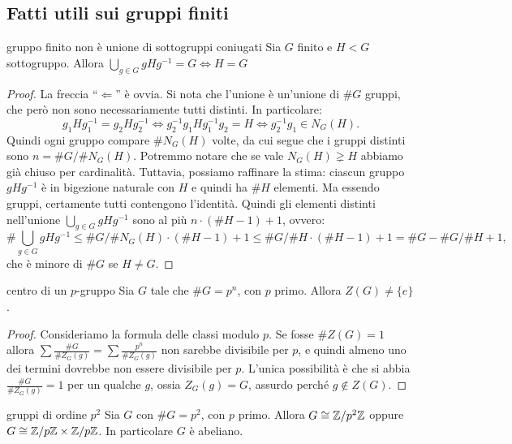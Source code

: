 \hypertarget{gruppi finiti}{
\subsection{Fatti utili sui gruppi finiti}
}
\hypertarget{es1}{
\begin{proposition}{gruppo finito non è unione di sottogruppi coniugati}
    Sia $G$ finito e $H <G$ sottogruppo. Allora $\bigcup_{g \in G} gHg^{-1} = G \iff H = G$
\end{proposition}
}
\begin{proof}
    La freccia ``$\Leftarrow$'' è ovvia. Si nota che l'unione è un'unione di $\# G $ gruppi, che però non sono necessariamente tutti distinti. In particolare:
    \[
    g_1 H g_1^{-1} = g_2 H g_2^{-1} \iff g_2^{-1}g_1 H g_1^{-1}g_2 = H \iff g_2^{-1}g_1 \in N_G(H).
    \]
    Quindi ogni gruppo compare $\# N_G(H)$ volte, da cui segue che i gruppi distinti sono $n = \#G / \#N_G(H)$. Potremmo notare che se vale $N_G(H) \gneq H $ abbiamo già chiuso per cardinalità. Tuttavia, possiamo raffinare la stima: ciascun gruppo $gHg^{-1}$ è in bigezione naturale con $H$ e quindi ha $\#H$ elementi. Ma essendo gruppi, certamente tutti contengono l'identità. Quindi gli elementi distinti nell'unione $\bigcup_{g \in G} gHg^{-1}$ sono al più $n\cdot(\#H -1) + 1$, ovvero:
    \[
    \#\bigcup_{g \in G} gHg^{-1} \leq \#G / \#N_G(H) \cdot (\#H -1) + 1 \leq \#G / \#H \cdot (\#H -1) + 1 = \#G - \#G / \#H + 1,
    \]
    che è minore di $\#G$ se $H \neq G$. 
\end{proof}
\begin{proposition}{centro di un $p$-gruppo}
    Sia $G$ tale che $\#G = p^n$, con $p$ primo. Allora $Z(G) \neq \{e\}$.
\end{proposition}
\begin{proof}
    Consideriamo la formula delle classi modulo $p$. Se fosse $\#Z(G) = 1$ allora $\sum \frac{\#G}{\#Z_G(g)} = \sum \frac{p^n}{\#Z_G(g)}$ non sarebbe divisibile per $p$, e quindi almeno uno dei termini dovrebbe non essere divisibile per $p$. L'unica possibilità è che si abbia $\frac{\#G}{\#Z_G(g)} = 1$ per un qualche $g$, ossia $Z_G(g) = G$, assurdo perché $g \notin Z(G)$.
\end{proof}
\begin{proposition}{gruppi di ordine $p^2$}
    Sia $G$ con $\#G = p^2$, con $p$ primo. Allora $G \cong \mathbb{Z}/p^2\mathbb{Z}$ oppure $G \cong \mathbb{Z}/p\mathbb{Z} \times \mathbb{Z}/p\mathbb{Z}$. In particolare $G$ è abeliano.
\end{proposition}
